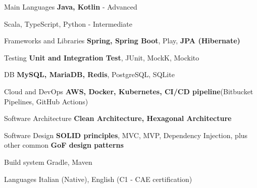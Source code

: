 
\begin{cvskills}
  \cvskill
    {Main Languages} %
    {\textbf{Java, Kotlin} - Advanced} %

  \cvskill
    {}
    {Scala, TypeScript, Python - Intermediate}

  \cvskill
    {Frameworks and Libraries} %
    {\textbf{Spring, Spring Boot}, Play, \textbf{JPA (Hibernate)}} %


  \cvskill
    {Testing} %
    {\textbf{Unit and Integration Test}, JUnit, MockK, Mockito} %

  \cvskill
    {DB} %
    {\textbf{MySQL, MariaDB, Redis}, PostgreSQL, SQLite } %
    
  \cvskill
    {Cloud and DevOps} %
    {\textbf{AWS, Docker, Kubernetes, CI/CD pipeline}(Bitbucket Pipelines, GitHub Actions)} %
        
  \cvskill
    {Software Architecture} %
    {\textbf{Clean Architecture, Hexagonal Architecture}} %
        
  \cvskill
    {Software Design} %
    {\textbf{SOLID principles}, MVC, MVP, Dependency Injection, plus other common\textbf{ GoF design patterns} } %

  \cvskill
    {Build system} %
    {Gradle, Maven} %

  \cvskill
    {Languages} %
    {Italian (Native), English (C1 - CAE certification)} %

\end{cvskills}
